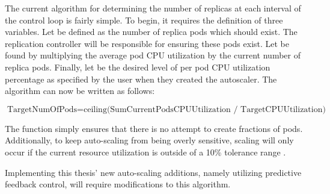 The current algorithm for determining the number of replicas at each interval
of the control loop is fairly simple.
To begin, it requires the definition of
three variables. Let  be defined as the number of
replica pods which should exist. The replication controller will be responsible
for ensuring these pods exist. Let  be
found by multiplying the average pod CPU utilization by the current number of
replica pods. Finally, let  be the desired level of
per pod CPU utilization percentage as specified by the user when they created
the autoscaler. The algorithm can now be written as follows:

\[ \mbox{TargetNumOfPods} = \mbox{ceiling(SumCurrentPodsCPUUtilization /
TargetCPUUtilization)} \]

The  function simply ensures that there is no attempt to create
fractions of pods. Additionally, to keep auto-scaling from being overly
sensitive, scaling will only occur if the current resource utilization is
outside of a 10\% tolerance range \cite{k8s-horizontal-pod-autoscaler-proposal}.

Implementing this thesis' new auto-scaling additions, namely utilizing
predictive feedback control, will require modifications to this algorithm.
